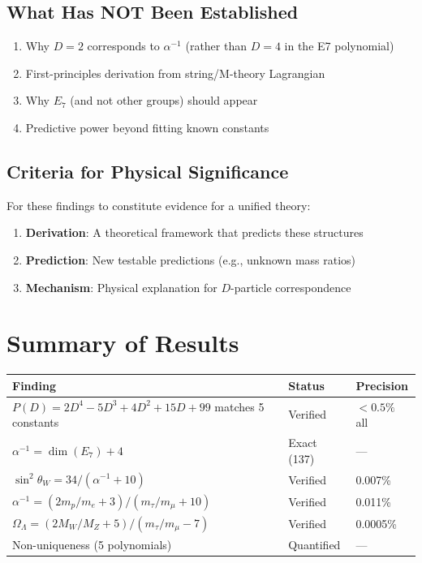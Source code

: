 \documentclass[11pt,a4paper]{article}
\begin{document}
\subsection{What Has NOT Been Established}

\begin{enumerate}
    \item Why $D = 2$ corresponds to $\alpha^{-1}$ (rather than $D = 4$ in the E7 polynomial)
    \item First-principles derivation from string/M-theory Lagrangian
    \item Why $E_7$ (and not other groups) should appear
    \item Predictive power beyond fitting known constants
\end{enumerate}

\subsection{Criteria for Physical Significance}

For these findings to constitute evidence for a unified theory:
\begin{enumerate}
    \item \textbf{Derivation}: A theoretical framework that predicts these structures
    \item \textbf{Prediction}: New testable predictions (e.g., unknown mass ratios)
    \item \textbf{Mechanism}: Physical explanation for $D$-particle correspondence
\end{enumerate}

\section{Summary of Results}

\begin{center}
\begin{tabular}{p{6cm}p{3cm}p{4cm}}
\hline
\textbf{Finding} & \textbf{Status} & \textbf{Precision} \\
\hline
$P(D) = 2D^4 - 5D^3 + 4D^2 + 15D + 99$ matches 5 constants & Verified & $< 0.5\%$ all \\
$\alpha^{-1} = \dim(E_7) + 4$ & Exact (137) & --- \\
$\sin^2\theta_W = 34/(\alpha^{-1}+10)$ & Verified & 0.007\% \\
$\alpha^{-1} = (2m_p/m_e + 3)/(m_\tau/m_\mu + 10)$ & Verified & 0.011\% \\
$\Omega_\Lambda = (2M_W/M_Z + 5)/(m_\tau/m_\mu - 7)$ & Verified & 0.0005\% \\
Non-uniqueness (5 polynomials) & Quantified & --- \\
\hline
\end{tabular}
\end{center}
\end{document}
